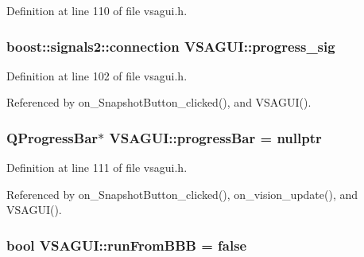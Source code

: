 Definition at line 110 of file vsagui.\+h.

\hypertarget{class_v_s_a_g_u_i_a3503e0415ff202c93fc4d7ee5c6f4fb8}{}
\subsubsection[{progress\+\_\+sig}]{\setlength{\rightskip}{0pt plus 5cm}boost\+::signals2\+::connection V\+S\+A\+G\+U\+I\+::progress\+\_\+sig\hspace{0.3cm}{\ttfamily [private]}}\label{class_v_s_a_g_u_i_a3503e0415ff202c93fc4d7ee5c6f4fb8}


Definition at line 102 of file vsagui.\+h.



Referenced by on\+\_\+\+Snapshot\+Button\+\_\+clicked(), and V\+S\+A\+G\+U\+I().

\hypertarget{class_v_s_a_g_u_i_a17b71e08eeff21b28e3816ec5482473c}{}
\subsubsection[{progress\+Bar}]{\setlength{\rightskip}{0pt plus 5cm}Q\+Progress\+Bar$\ast$ V\+S\+A\+G\+U\+I\+::progress\+Bar = nullptr\hspace{0.3cm}{\ttfamily [private]}}\label{class_v_s_a_g_u_i_a17b71e08eeff21b28e3816ec5482473c}


Definition at line 111 of file vsagui.\+h.



Referenced by on\+\_\+\+Snapshot\+Button\+\_\+clicked(), on\+\_\+vision\+\_\+update(), and V\+S\+A\+G\+U\+I().

\hypertarget{class_v_s_a_g_u_i_ad093d6fc67a6ad9e27948023ddba775d}{}
\subsubsection[{run\+From\+B\+B\+B}]{\setlength{\rightskip}{0pt plus 5cm}bool V\+S\+A\+G\+U\+I\+::run\+From\+B\+B\+B = false\hspace{0.3cm}{\ttfamily [private]}}\label{class_v_s_a_g_u_i_ad093d6fc67a6ad9e27948023ddba775d}


